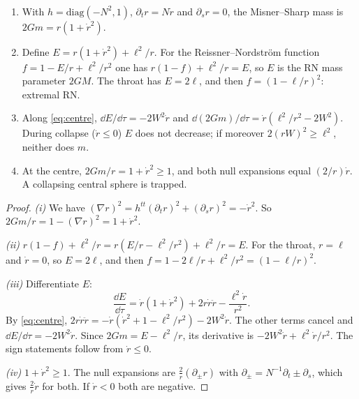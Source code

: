 \begin{proposition}\label{prop:centremass}\ver\
\begin{enumerate}[label=(\roman*)]
\item With $h=\mathrm{diag}(-N^2,1)$, $\partial_tr=N\dot r$ and $\partial_sr=0$, the Misner--Sharp mass is $2Gm=r(1+\dot r^2)$.
\item Define $E=r(1+\dot r^2)+\ell^2/r$. For the Reissner--Nordstr\"om function $f=1-E/r+\ell^2/r^2$ one has $r(1-f)+\ell^2/r=E$, so $E$ is the RN mass parameter $2GM$. The throat has $E=2\ell$, and then $f=(1-\ell/r)^2$: extremal RN.
\item Along \eqref{eq:centre}, $\dd E/\dd\tau=-2W^2\dot r$ and $\dd(2Gm)/\dd\tau=\dot r(\ell^2/r^2-2W^2)$. During collapse ($\dot r\le0$) $E$ does not decrease; if moreover $2(rW)^2\ge\ell^2$, neither does $m$.
\item At the centre, $2Gm/r=1+\dot r^2\ge1$, and both null expansions equal $(2/r)\dot r$. A collapsing central sphere is trapped.
\end{enumerate}
\end{proposition}
\begin{proof}
\emph{(i)} We have $(\nabla r)^2=h^{tt}(\partial_tr)^2+(\partial_sr)^2=-\dot r^2$. So $2Gm/r=1-(\nabla r)^2=1+\dot r^2$.

\emph{(ii)} $r(1-f)+\ell^2/r=r(E/r-\ell^2/r^2)+\ell^2/r=E$. For the throat, $r=\ell$ and $\dot r=0$, so $E=2\ell$, and then $f=1-2\ell/r+\ell^2/r^2=(1-\ell/r)^2$.

\emph{(iii)} Differentiate $E$:
\[
\frac{\dd E}{\dd\tau}=\dot r(1+\dot r^2)+2r\dot r\ddot r-\frac{\ell^2\dot r}{r^2}.
\]
By \eqref{eq:centre}, $2r\dot r\ddot r=-\dot r(\dot r^2+1-\ell^2/r^2)-2W^2\dot r$. The other terms cancel and $\dd E/\dd\tau=-2W^2\dot r$. Since $2Gm=E-\ell^2/r$, its derivative is $-2W^2\dot r+\ell^2\dot r/r^2$. The sign statements follow from $\dot r\le0$.

\emph{(iv)} $1+\dot r^2\ge1$. The null expansions are $\frac2r(\partial_\pm r)$ with $\partial_\pm=N^{-1}\partial_t\pm\partial_s$, which gives $\frac2r\dot r$ for both. If $\dot r<0$ both are negative.
\end{proof}



